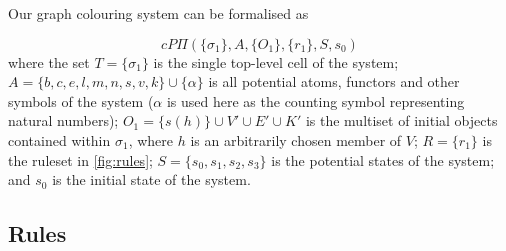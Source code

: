 Our graph colouring system can be formalised as

\[
cP\Pi(\{\sigma_1\}, A, \{O_1\}, \{r_1\}, S, s_0)
\] where the set \(T = \{\sigma_1\}\) is the single top-level cell of the system; \(A = \{b, c, e,\allowbreak l,\allowbreak m,\allowbreak n, s, v, k\} \allowbreak \cup \{\alpha\}\) is all potential atoms, functors and other symbols of the system (\(\alpha\) is used here as the counting symbol representing natural numbers); \(O_1 = \{s(h)\} \cup V' \allowbreak \cup E' \allowbreak \cup K'\) is the multiset of initial objects contained within \(\sigma_1\), where \(h\) is an arbitrarily chosen member of \(V\); \(R = \{r_1\}\) is the ruleset in \autoref{fig:rules}; \(S = \{s_0, s_1, s_2, s_3\}\) is the potential states of the system; and \(s_0\) is the initial state of the system.



\subsection{\label{sec:rules}Rules}

